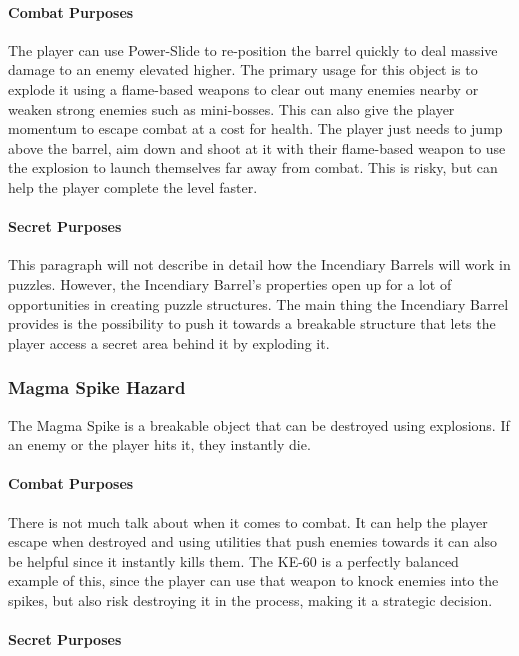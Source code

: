 \documentclass[12pt]{article}
\begin{document}
\paragraph{Combat Purposes}

The player can use Power-Slide to re-position the barrel quickly to deal massive damage to an enemy elevated higher. The primary usage for this object is to explode it using a flame-based weapons to clear out many enemies nearby or weaken strong enemies such as mini-bosses. This can also give the player momentum to escape combat at a cost for health. The player just needs to jump above the barrel, aim down and shoot at it with their flame-based weapon to use the explosion to launch themselves far away from combat. This is risky, but can help the player complete the level faster. 

\paragraph{Secret Purposes}

This paragraph will not describe in detail how the Incendiary Barrels will work in puzzles. However, the Incendiary Barrel's properties open up for a lot of opportunities in creating puzzle structures. The main thing the Incendiary Barrel provides is the possibility to push it towards a breakable structure that lets the player access a secret area behind it by exploding it. 

\subsubsection{Magma Spike Hazard}

The Magma Spike is a breakable object that can be destroyed using explosions. If an enemy or the player hits it, they instantly die. 

\paragraph{Combat Purposes}

There is not much talk about when it comes to combat. It can help the player escape when destroyed and using utilities that push enemies towards it can also be helpful since it instantly kills them. The KE-60 is a perfectly balanced example of this, since the player can use that weapon to knock enemies into the spikes, but also risk destroying it in the process, making it a strategic decision.

\paragraph{Secret Purposes}
\end{document}
